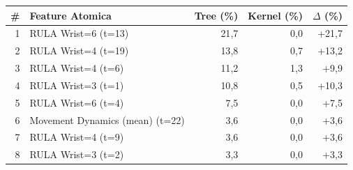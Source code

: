 \begin{tabular*}{\linewidth}{@{}r@{\extracolsep{\fill}}lrrr@{}}
\toprule
\textbf{\#} & \textbf{Feature Atomica} & \textbf{Tree (\%)} & \textbf{Kernel (\%)} & \textbf{$\Delta$ (\%)} \\
\midrule
1 & RULA Wrist=6 (t=13) & 21{,}7 & 0{,}0 & +21{,}7 \\
2 & RULA Wrist=4 (t=19) & 13{,}8 & 0{,}7 & +13{,}2 \\
3 & RULA Wrist=4 (t=6) & 11{,}2 & 1{,}3 & +9{,}9 \\
4 & RULA Wrist=3 (t=1) & 10{,}8 & 0{,}5 & +10{,}3 \\
5 & RULA Wrist=6 (t=4) & 7{,}5 & 0{,}0 & +7{,}5 \\
6 & Movement Dynamics (mean) (t=22) & 3{,}6 & 0{,}0 & +3{,}6 \\
7 & RULA Wrist=4 (t=9) & 3{,}6 & 0{,}0 & +3{,}6 \\
8 & RULA Wrist=3 (t=2) & 3{,}3 & 0{,}0 & +3{,}3 \\
\bottomrule
\end{tabular*}
